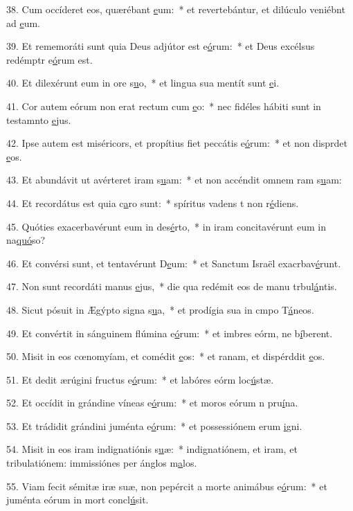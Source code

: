 38. Cum occíderet eos, quærébant \uline{e}um:~* et revertebántur, et dilúculo veniébnt ad \uline{e}um.\par 
39. Et rememoráti sunt quia Deus adjútor est e\uline{ó}rum:~* et Deus excélsus redémptr e\uline{ó}rum est.\par 
40. Et dilexérunt eum in ore s\uline{u}o,~* et lingua sua mentít sunt \uline{e}i.\par 
41. Cor autem eórum non erat rectum cum \uline{e}o:~* nec fidéles hábiti sunt in testamnto \uline{e}jus.\par 
42. Ipse autem est miséricors, et propítius fiet peccátis e\uline{ó}rum:~* et non disprdet \uline{e}os.\par 
43. Et abundávit ut avérteret iram s\uline{u}am:~* et non accéndit omnem ram s\uline{u}am:\par 
44. Et recordátus est quia c\uline{a}ro sunt:~* spíritus vadens t non r\uline{é}diens.\par 
45. Quóties exacerbavérunt eum in des\uline{é}rto,~* in iram concitavérunt eum in na\uline{quó}so?\par 
46. Et convérsi sunt, et tentavérunt D\uline{e}um:~* et Sanctum Israël exacrbav\uline{é}runt.\par 
47. Non sunt recordáti manus \uline{e}jus,~* die qua redémit eos de manu trbul\uline{á}ntis.\par 
48. Sicut pósuit in Ægýpto signa s\uline{u}a,~* et prodígia sua in cmpo T\uline{á}neos.\par 
49. Et convértit in sánguinem flúmina e\uline{ó}rum:~* et imbres eórm, ne b\uline{í}berent.\par 
50. Misit in eos cœnomyíam, et comédit \uline{e}os:~* et ranam, et dispérddit \uline{e}os.\par 
51. Et dedit ærúgini fructus e\uline{ó}rum:~* et labóres eórm loc\uline{ú}stæ.\par 
52. Et occídit in grándine víneas e\uline{ó}rum:~* et moros eórum n pru\uline{í}na.\par 
53. Et trádidit grándini juménta e\uline{ó}rum:~* et possessiónem erum \uline{i}gni.\par 
54. Misit in eos iram indignatiónis s\uline{u}æ:~* indignatiónem, et iram, et tribulatiónem: immissiónes per ánglos m\uline{a}los.\par 
55. Viam fecit sémitæ iræ suæ, non pepércit a morte animábus e\uline{ó}rum:~* et juménta eórum in mort concl\uline{ú}sit.\par 
